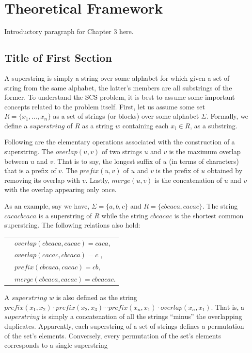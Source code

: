 \chapter{Theoretical Framework} 

Introductory paragraph for Chapter 3 here.

\section{Title of First Section}

A superstring is simply a string over
some alphabet for which given a set of string from the same
alphabet, the latter's members are all substrings of the former.
To understand the SCS problem, it is best to assume some important concepts
related to the problem itself. First, let
us assume some set $R = \{x_1, \ldots , x_n\}$ as
 a set of strings (or blocks) over some alphabet $\Sigma$. 
Formally, we define a $superstring$ of $R$ as a 
string $w$ containing each $x_i \in R$, as a substring.

Following are the elementary operations associated 
with the construction of a superstring.
The $overlap(u, v)$ of two strings $u$ and $v$ 
is the maximum overlap between $u$ and $v$. That is to say,
the longest suffix of $u$ (in terms of characters) that is a prefix of $v$.
The $prefix(u, v)$ of $u$ and $v$ is the prefix of $u$
obtained by removing its overlap with $v$.
Lastly, $merge(u, v)$ is the
 concatenation of $u$ and $v$ with the overlap appearing
only once.

As an example, say we have, $\Sigma = \{a, b, c\}$ and $R = \{cbcaca, cacac\}$.
The string $cacacbcaca$ is a superstring of $R$ while the string
$cbcacac$ is the shortest common superstring. The
following relations also hold: 

\begin{tabular}{p{0.5cm}l}
&$overlap(cbcaca, cacac) = caca$, \\
&$overlap(cacac, cbcaca) = c$ ,\\
&$prefix(cbcaca, cacac) = cb$,\\
&$merge(cbcaca, cacac) = cbcacac$.
\end{tabular}

A $superstring$ $w$ is also defined as
 the string $prefix(x_1, x_2) \cdot prefix(x_2, x_3) \cdots prefix(x_n, x_1) \cdot overlap(x_n, x_1)$.
That is, a $superstring$ is simply
 a concatenation of all the strings ``minus'' the overlapping duplicates.
 Apparently, each superstring of a set of strings defines a permutation of the set’s elements.
Conversely, every permutation of the set’s elements corresponds to a single superstring
			 

